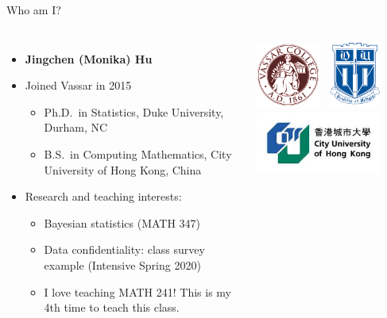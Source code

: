\documentclass[slidestop,compress,mathserif]{beamer}
\begin{document}
\begin{frame}{Who am I?}
\begin{columns}
\vspace{-2cm}
\begin{itemize}
\item \textbf{Jingchen (Monika) Hu}
\vspace{0.5cm}
\item Joined Vassar in 2015
\begin{itemize}
\item Ph.D.\ in Statistics, Duke University, Durham, NC 
\item B.S.\ in Computing Mathematics, City University of Hong Kong, China 
\end{itemize}
\vspace{0.5cm}
\item Research and teaching interests:
\begin{itemize}
\item Bayesian statistics (MATH 347)
\item Data confidentiality: class survey example (Intensive Spring 2020)
\item I love teaching MATH 241! This is my 4th time to teach this class.
\end{itemize}
\end{itemize}
\includegraphics[width=2.1cm,height=2.1cm]{figures/vassar-logo.png}
\vspace{0.5cm}
\includegraphics[width=2.1cm,height=2.2cm]{figures/duke-logo.png}
\vspace{0.5cm}
\includegraphics[width=4.1cm,height=2.2cm]{figures/cityu-logo.jpg}
\end{columns}

\end{frame}
\end{document}

